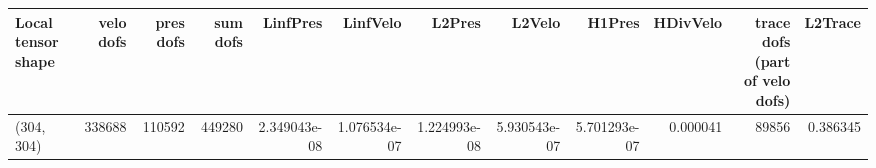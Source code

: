 \begin{tabular}{lrrrrrrrrrrr}
\toprule
Local tensor shape &  velo dofs &  pres dofs &  sum dofs &     LinfPres &     LinfVelo &       L2Pres &       L2Velo &       H1Pres &  HDivVelo &  trace dofs (part of velo dofs) &  L2Trace \\
\midrule
        (304, 304) &     338688 &     110592 &    449280 & 2.349043e-08 & 1.076534e-07 & 1.224993e-08 & 5.930543e-07 & 5.701293e-07 &  0.000041 &                           89856 & 0.386345 \\
\bottomrule
\end{tabular}
